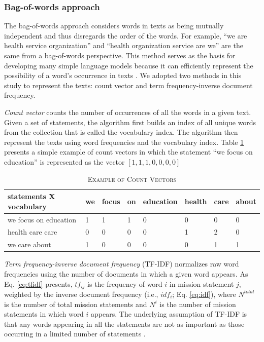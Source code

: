 \documentclass[11pt]{article}
\begin{document}
\subsubsection{Bag-of-words approach}

The bag-of-words approach considers words in texts as being mutually independent and thus disregards the order of the words. For example, ``we are health service organization'' and ``health organization service are we'' are the same from a bag-of-words perspective. This method serves as the basis for developing many simple language models because it can efficiently represent the possibility of a word's occurrence in texts \parencite{BengfortAppliedTextAnalysis2018}. We adopted two methods in this study to represent the texts: count vector and term frequency-inverse document frequency.

\textit{Count vector} counts the number of occurrences of all the words in a given text. Given a set of statements, the algorithm first builds an index of all unique words from the collection that is called the vocabulary index. The algorithm then represent the texts using word frequencies and the vocabulary index. Table \ref{tab:count_vector} presents a simple example of count vectors in which the statement ``we focus on education'' is represented as the vector $[1, 1, 1, 0, 0, 0, 0]$

\begin{table}
\caption{\textsc{Example of Count Vectors}} \label{tab:count_vector}
\begin{tabular}{m{3.9cm}|m{0.9cm}|m{1cm}|m{0.9cm}|m{1.5cm}|m{1cm}|m{1cm}|m{0.8cm}}
    \hline
    statements X vocabulary & we & focus & on & education & health & care & about \\
    \hline
    we focus on education & 1 & 1 & 1 & 0 & 0 & 0 & 0 \\ 
    \hdashline
    health care care  & 0 & 0 & 0 & 0 & 1 & 2 & 0 \\ 
    \hdashline
    we care about & 1 & 0 & 0 & 0 & 0 & 1 & 1 \\ 
    \hline
\end{tabular}
\end{table}

\textit{Term frequency-inverse document frequency} (TF-IDF) normalizes raw word frequencies using the number of documents in which a given word appears. As Eq. \ref{eq:tfidf} presents, $tf_{ij}$ is the frequency of word $i$ in mission statement $j$, weighted by the inverse document frequency (i.e., $idf_i$; Eq. \ref{eq:idf}), where $N^{total}$ is the number of total mission statements and $N^{i}$ is the number of mission statements in which word $i$ appears. The underlying assumption of TF-IDF is that any words appearing in all the statements are not as important as those occurring in a limited number of statements \parencite[278]{JurafskySpeechLanguageProcessing2017}.
\end{document}

